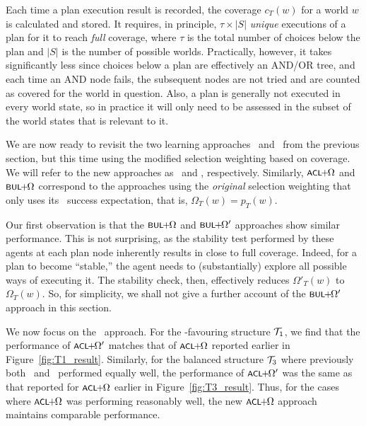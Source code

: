 Each time a plan execution result is recorded, the coverage
$c_T(w)$ for a world $w$ is calculated and stored.
It requires, in principle, $\tau \times |S|$ \emph{unique} executions of
a plan for it to reach \emph{full} coverage, where $\tau$ is the total number of
choices below the plan and $|S|$ is the number of possible worlds. Practically,
however, it takes significantly less since choices below a plan are effectively
an AND/OR tree, and each time an AND node fails, the subsequent
nodes are not tried and are counted as covered for the world in question.
Also, a plan is generally not executed in every world state, so in
practice it will only need to be assessed in the subset of the world
states that is relevant to it.






\medskip We are now ready to revisit the two learning approaches \CL\ and \BUL\
from the previous section, but this time using the modified selection weighting
based on coverage.
We will refer to the new approaches as \CLSELB\ and \BULSELB, respectively.
Similarly, $\CLSELA$ and $\BULSELA$ correspond to the approaches using the
\emph{original} selection weighting that only uses its \dt\ success
expectation, that is, $\Omega_T(w) = p_T(w)$.


Our first observation is that the $\BULSELA$ and $\BULSELB$ approaches show
similar performance.
This is not surprising, as the stability test performed by these agents at each
plan node inherently results in close to full coverage. Indeed, for a plan to
become ``stable,'' the agent needs to (substantially) explore all possible  ways
of executing it. The stability check, then, effectively reduces $\Omega'_T(w)$ to
$\Omega_T(w)$.
So, for simplicity, we shall not give a further account of the $\BULSELB$
approach in this section.



We now focus on the \CL\ approach.
For the \CL-favouring structure ${\mathcal{T}}_1$, we find that the performance of $\CLSELB$ matches that
of $\CLSELA$ reported earlier in Figure~\ref{fig:T1_result}.
Similarly, for the balanced structure ${\mathcal{T}}_3$ where previously both \CL\ and
\BUL\ performed equally well, the performance of $\CLSELB$
was the same as that reported for $\CLSELA$ earlier in Figure~\ref{fig:T3_result}.
Thus, for the cases where $\CLSELA$ was performing reasonably well, the new $\CLSELA$ approach maintains comparable performance.

